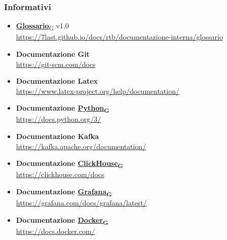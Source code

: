 \subsubsection{Informativi}
\begin{itemize}
    \item\href{https://7last.github.io/docs/rtb/documentazione-interna/glossario\#glossario}{\textbf{Glossario}\textsubscript{G}} v1.0\\ \url{https://7last.github.io/docs/rtb/documentazione-interna/glossario}
    \item\textbf{Documentazione Git}\\ \url{https://git-scm.com/docs}
    \item\textbf{Documentazione Latex}\\ \url{https://www.latex-project.org/help/documentation/}
    \item\textbf{Documentazione \href{https://7last.github.io/docs/rtb/documentazione-interna/glossario\#python}{Python\textsubscript{G}}}\\ \url{https://docs.python.org/3/}
    \item\textbf{Documentazione Kafka}\\ \url{https://kafka.apache.org/documentation/}
    \item\textbf{Documentazione \href{https://7last.github.io/docs/rtb/documentazione-interna/glossario\#clickhouse}{ClickHouse\textsubscript{G}}}\\ \url{https://clickhouse.com/docs}
    \item\textbf{Documentazione \href{https://7last.github.io/docs/rtb/documentazione-interna/glossario\#grafana}{Grafana\textsubscript{G}}}\\ \url{https://grafana.com/docs/grafana/latest/}
    \item\textbf{Documentazione \href{https://7last.github.io/docs/rtb/documentazione-interna/glossario\#docker}{Docker\textsubscript{G}}}\\ \url{https://docs.docker.com/}
\end{itemize}